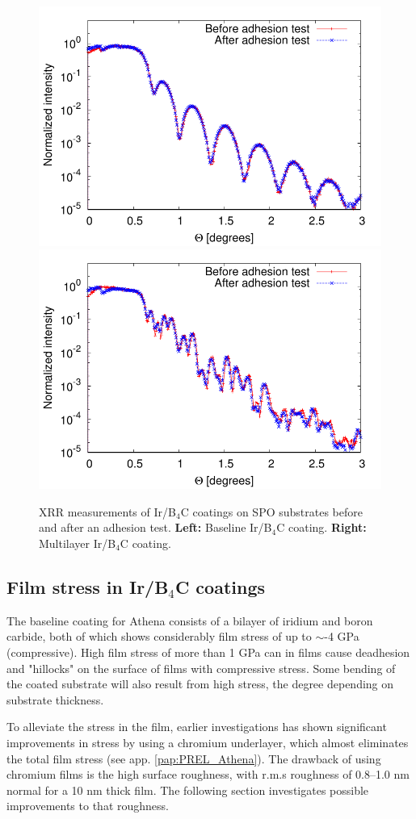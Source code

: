 \begin{figure}[!h]
  \center  \includegraphics[width=0.47\linewidth]{figures/athena/coating_on_spo/123-11-09_adh_2.pdf}
  \includegraphics[width=0.47\linewidth]{figures/athena/coating_on_spo/120-09-26_adh_2.pdf}
\caption{\footnotesize XRR measurements of Ir/B$_4$C coatings on SPO substrates before and after an adhesion test. \textbf{Left:} Baseline Ir/B$_4$C coating. \textbf{Right:} Multilayer Ir/B$_4$C coating.}\label{fig:qa_adh}
\end{figure}


\subsection{Film stress in Ir/B$_4$C coatings}\label{sec:Athena_cr_impro}
The baseline coating for Athena consists of a bilayer of iridium and boron carbide, both of which shows considerably film stress of up to $\sim$-4 GPa (compressive). High film stress of more than 1 GPa can in films cause deadhesion and "hillocks" on the surface of films with compressive stress. Some bending of the coated substrate will also result from high stress, the degree depending on substrate thickness.

To alleviate the stress in the film, earlier investigations has shown significant improvements in stress by using a chromium underlayer, which almost eliminates the total film stress (see app. \ref{pap:PREL_Athena}). The drawback of using chromium films is the high surface roughness, with r.m.s roughness of 0.8--1.0 nm normal for a 10 nm thick film. The following section investigates possible improvements to that roughness.

